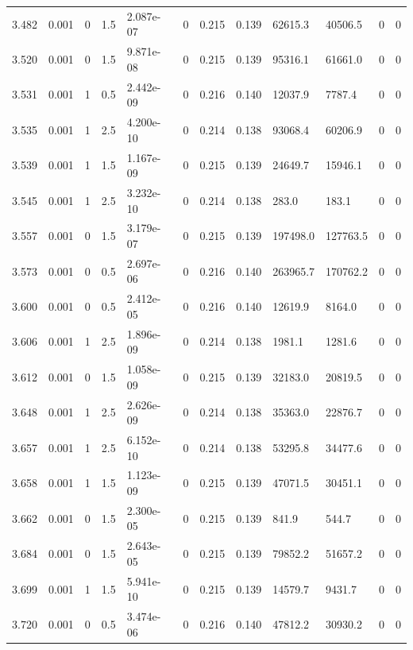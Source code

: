 \documentclass[preview]{standalone}
\begin{document}
{{{{{{\begin{tabular}{L{1.2cm}C{1.2cm} C{0.3cm}C{0.5cm} C{1.4cm}C{1.4cm} C{1.4cm}C{1.4cm} C{1.6cm}C{1.6cm} C{1.6cm}C{1.6cm}}
  3.482  &  0.001  & 0     & 1.5 &  2.087e-07  & 0  &  0.215&   0.139& 62615.3 & 40506.5   &  0 & 0  \\ 
  3.520  &  0.001  & 0     & 1.5 &  9.871e-08  & 0  &  0.215&   0.139& 95316.1 & 61661.0   &  0 & 0  \\ 
  3.531  &  0.001  & 1     & 0.5 &  2.442e-09  & 0  &  0.216&   0.140& 12037.9 & 7787.4   &  0 & 0  \\ 
  3.535  &  0.001  & 1     & 2.5 &  4.200e-10  & 0  &  0.214&   0.138& 93068.4 & 60206.9   &  0 & 0  \\ 
  3.539  &  0.001  & 1     & 1.5 &  1.167e-09  & 0  &  0.215&   0.139& 24649.7 & 15946.1   &  0 & 0  \\ 
  3.545  &  0.001  & 1     & 2.5 &  3.232e-10  & 0  &  0.214&   0.138& 283.0 & 183.1   &  0 & 0  \\ 
  3.557  &  0.001  & 0     & 1.5 &  3.179e-07  & 0  &  0.215&   0.139& 197498.0 & 127763.5   &  0 & 0  \\ 
  3.573  &  0.001  & 0     & 0.5 &  2.697e-06  & 0  &  0.216&   0.140& 263965.7 & 170762.2   &  0 & 0  \\ 
  3.600  &  0.001  & 0     & 0.5 &  2.412e-05  & 0  &  0.216&   0.140& 12619.9 & 8164.0   &  0 & 0  \\ 
  3.606  &  0.001  & 1     & 2.5 &  1.896e-09  & 0  &  0.214&   0.138& 1981.1 & 1281.6   &  0 & 0  \\ 
  3.612  &  0.001  & 0     & 1.5 &  1.058e-09  & 0  &  0.215&   0.139& 32183.0 & 20819.5   &  0 & 0  \\ 
  3.648  &  0.001  & 1     & 2.5 &  2.626e-09  & 0  &  0.214&   0.138& 35363.0 & 22876.7   &  0 & 0  \\ 
  3.657  &  0.001  & 1     & 2.5 &  6.152e-10  & 0  &  0.214&   0.138& 53295.8 & 34477.6   &  0 & 0  \\ 
  3.658  &  0.001  & 1     & 1.5 &  1.123e-09  & 0  &  0.215&   0.139& 47071.5 & 30451.1   &  0 & 0  \\ 
  3.662  &  0.001  & 0     & 1.5 &  2.300e-05  & 0  &  0.215&   0.139& 841.9 & 544.7   &  0 & 0  \\ 
  3.684  &  0.001  & 0     & 1.5 &  2.643e-05  & 0  &  0.215&   0.139& 79852.2 & 51657.2   &  0 & 0  \\ 
  3.699  &  0.001  & 1     & 1.5 &  5.941e-10  & 0  &  0.215&   0.139& 14579.7 & 9431.7   &  0 & 0  \\ 
  3.720  &  0.001  & 0     & 0.5 &  3.474e-06  & 0  &  0.216&   0.140& 47812.2 & 30930.2   &  0 & 0  \\ 

\end{tabular}}}}}}}
\end{document}
